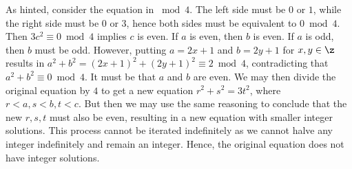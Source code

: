 \begin{enumerate}
    \begin{sol}
        As hinted, consider the equation in $\bmod 4$. The left side must be $0$ or $1$, while the right side must be $0$ or $3$, hence both sides must be equivalent to $0 \bmod 4$. Then $3c^2 \equiv 0 \bmod 4$ implies $c$ is even. If $a$ is even, then $b$ is even. If $a$ is odd, then $b$ must be odd. However, putting $a = 2x + 1$ and $b = 2y + 1$ for $x, y \in \z$ results in $a^2 + b^2 = (2x + 1)^2 + (2y + 1)^2 \equiv 2 \bmod 4$, contradicting that $a^2 + b^2 \equiv 0 \bmod 4$. It must be that $a$ and $b$ are even. We may then divide the original equation by $4$ to get a new equation $r^2 + s^2 = 3t^2$, where $r < a, s < b, t < c$. But then we may use the same reasoning to conclude that the new $r, s, t$ must also be even, resulting in a new equation with smaller integer solutions. This process cannot be iterated indefinitely as we cannot halve any integer indefinitely and remain an integer. Hence, the original equation does not have integer solutions.
    \end{sol}
\end{enumerate}